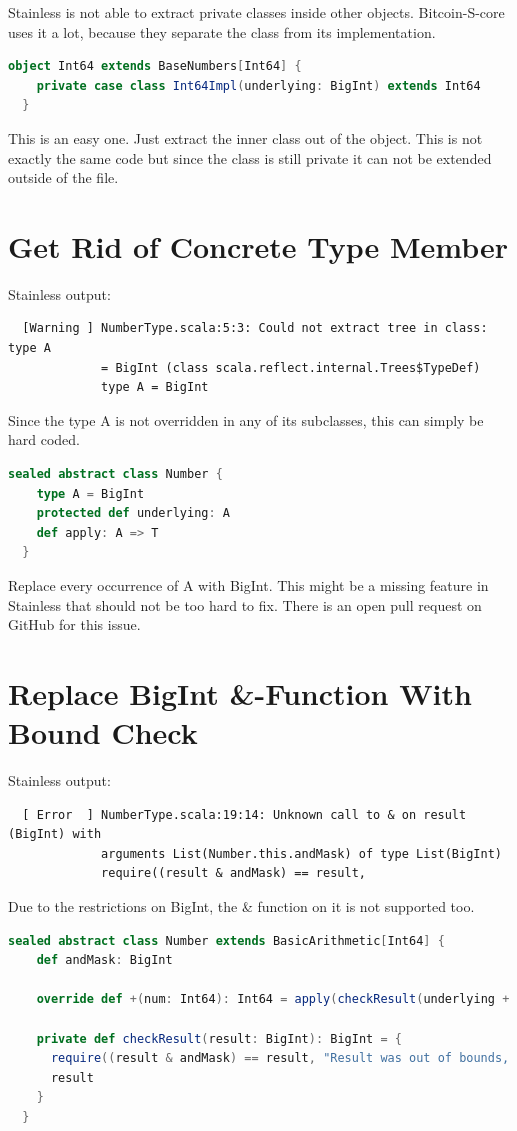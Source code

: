 Stainless is not able to extract private classes inside other objects.
Bitcoin-S-core uses it a lot, because they separate the class from its implementation.
\begin{lstlisting}[language=scala]
  object Int64 extends BaseNumbers[Int64] {
    private case class Int64Impl(underlying: BigInt) extends Int64 
  }
\end{lstlisting}

This is an easy one.
Just extract the inner class out of the object.
This is not exactly the same code but since the class is still private it can not be extended outside of the file.


\section{Get Rid of Concrete Type Member}
Stainless output:
{\footnotesize\begin{verbatim}
  [Warning ] NumberType.scala:5:3: Could not extract tree in class: type A
             = BigInt (class scala.reflect.internal.Trees$TypeDef)
             type A = BigInt
\end{verbatim}}

Since the type A is not overridden in any of its subclasses, this can simply be hard coded.
\begin{lstlisting}[language=scala]
  sealed abstract class Number {
    type A = BigInt
    protected def underlying: A
    def apply: A => T
  }
\end{lstlisting}

Replace every occurrence of A with BigInt.
This might be a missing feature in Stainless that should not be too hard to fix.
There is an open pull request  on GitHub for this issue.


\section{Replace BigInt \&-Function With Bound Check}
Stainless output:
{\footnotesize\begin{verbatim}
  [ Error  ] NumberType.scala:19:14: Unknown call to & on result (BigInt) with
             arguments List(Number.this.andMask) of type List(BigInt)
             require((result & andMask) == result,
\end{verbatim}}

Due to the restrictions on BigInt, the \& function on it is not supported too.
\begin{lstlisting}[language=scala]
  sealed abstract class Number extends BasicArithmetic[Int64] {
    def andMask: BigInt

    override def +(num: Int64): Int64 = apply(checkResult(underlying + num.underlying))

    private def checkResult(result: BigInt): BigInt = {
      require((result & andMask) == result, "Result was out of bounds, got: " + result)
      result
    }
  }
\end{lstlisting}

